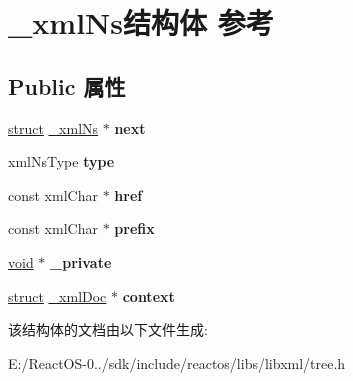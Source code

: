 \hypertarget{struct__xml_ns}{}\section{\+\_\+xml\+Ns结构体 参考}
\label{struct__xml_ns}
\subsection*{Public 属性}
\begin{DoxyCompactItemize}
\item 
\mbox{\label{struct__xml_ns_ab79fd0a42e28dd61e73c131c58369a69}} 
\hyperlink{interfacestruct}{struct} \hyperlink{struct__xml_ns}{\+\_\+xml\+Ns} $\ast$ {\bfseries next}
\item 
\mbox{\label{struct__xml_ns_a84c713211df0640c7cfb1e7c64149214}} 
xml\+Ns\+Type {\bfseries type}
\item 
\mbox{\label{struct__xml_ns_a293a79d98f3e8dc28f9997fd9cf3bd04}} 
const xml\+Char $\ast$ {\bfseries href}
\item 
\mbox{\label{struct__xml_ns_a91810d0b5939f171f87bc75bbcdf8a2b}} 
const xml\+Char $\ast$ {\bfseries prefix}
\item 
\mbox{\label{struct__xml_ns_a3222313b0824c3269b6ecdcfc428b01d}} 
\hyperlink{interfacevoid}{void} $\ast$ {\bfseries \+\_\+private}
\item 
\mbox{\label{struct__xml_ns_ad809e6dac26d39564d2022f5fb287fa6}} 
\hyperlink{interfacestruct}{struct} \hyperlink{struct__xml_doc}{\+\_\+xml\+Doc} $\ast$ {\bfseries context}
\end{DoxyCompactItemize}


该结构体的文档由以下文件生成\+:\begin{DoxyCompactItemize}
\item 
E\+:/\+React\+O\+S-\/0../sdk/include/reactos/libs/libxml/tree.\+h\end{DoxyCompactItemize}
